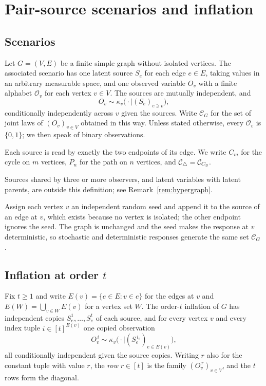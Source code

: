 \section{Pair-source scenarios and inflation}\label{sec:pairsource}\label{sec:setup}

\providecommand{\Cscen}[1]{\mathcal C_{#1}}
\providecommand{\supp}{\operatorname{supp}}

\subsection{Scenarios}

\begin{definition}\label{def:pairsource}
Let $G=(V,E)$ be a finite simple graph without isolated vertices. The associated scenario has one latent source $S_e$ for each edge $e\in E$, taking values in an arbitrary measurable space, and one observed variable $O_v$ with a finite alphabet $\mathcal O_v$ for each vertex $v\in V$. The sources are mutually independent, and
\[
O_v\sim\kappa_v\bigl(\cdot\mid(S_e)_{e\ni v}\bigr),
\]
conditionally independently across $v$ given the sources. Write $\Cscen{G}$ for the set of joint laws of $(O_v)_{v\in V}$ obtained in this way. Unless stated otherwise, every $\mathcal O_v$ is $\{0,1\}$; we then speak of binary observations.
\end{definition}

Each source is read by exactly the two endpoints of its edge. We write $C_m$ for the cycle on $m$ vertices, $P_n$ for the path on $n$ vertices, and $\Ctri=\Cscen{C_3}$.

Sources shared by three or more observers, and latent variables with latent parents, are outside this definition; see Remark~\ref{rem:hypergraph}.

Assign each vertex $v$ an independent random seed and append it to the source of an edge at $v$, which exists because no vertex is isolated; the other endpoint ignores the seed. The graph is unchanged and the seed makes the response at $v$ deterministic, so stochastic and deterministic responses generate the same set $\Cscen{G}$ \cite{WSF2019}.

\subsection{Inflation at order \texorpdfstring{$t$}{t}}

\begin{definition}\label{def:ginflation}
Fix $t\ge1$ and write $E(v)=\{e\in E:v\in e\}$ for the edges at $v$ and $E(W)=\bigcup_{v\in W}E(v)$ for a vertex set $W$. The order-$t$ inflation of $G$ has independent copies $S_e^1,\dots,S_e^t$ of each source, and for every vertex $v$ and every index tuple $i\in[t]^{E(v)}$ one copied observation
\[
O_v^{\,i}\sim\kappa_v\bigl(\cdot\mid(S_e^{\,i_e})_{e\in E(v)}\bigr),
\]
all conditionally independent given the source copies. Writing $r$ also for the constant tuple with value $r$, the \emph{row} $r\in[t]$ is the family $(O_v^{\,r})_{v\in V}$, and the $t$ rows form the diagonal.
\end{definition}

